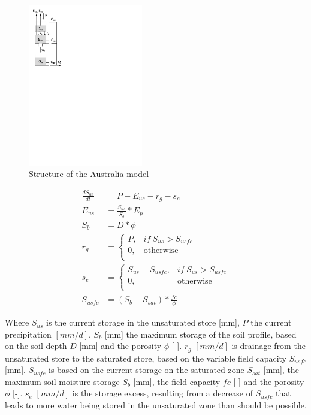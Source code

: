 { 																	%
\begin{figure}
\includegraphics[trim=1cm 18cm 14cm 0.8cm,width=5cm,keepaspectratio]{./AppA_files/19_schematic.pdf}
\caption{Structure of the Australia model} \label{fig:19_schematic}
\end{figure}

\begin{align}
	\frac{dS_{us}}{dt} &= P-E_{us}-r_g -s_e\\
	E_{us} &= \frac{S_{us}}{S_b}*E_p\\
	S_b &= D*\phi\\
	r_g &= 
	\begin{cases}
		P, & if~S_{us} > S_{usfc}\\
		0, & \text{otherwise} \\
	\end{cases} \\
	s_e &= \begin{cases}
			S_{us} - S_{usfc}, & if~S_{us} > S_{usfc}\\
			0, & \text{otherwise} \\
			\end{cases}\\
	S_{usfc} &= (S_b - S_{sat})*\frac{fc}{\phi} 
\end{align}

Where $S_{us}$ is the current storage in the unsaturated store [mm], $P$ the current precipitation $[mm/d]$, $S_b$ [mm] the maximum storage of the soil profile, based on the soil depth $D$ [mm] and the porosity $\phi$ [-]. $r_g$ $[mm/d]$ is drainage from the unsaturated store to the saturated store, based on the variable field capacity $S_{usfc}$ [mm]. $S_{usfc}$ is based on the current storage on the saturated zone $S_{sat}$ [mm], the maximum soil moisture storage $S_b$ [mm], the field capacity $fc$ [-] and the porosity $\phi$ [-]. $s_e$ $[mm/d]$ is the storage excess, resulting from a decrease of $S_{usfc}$ that leads to more water being stored in the unsaturated zone than should be possible.

} %

